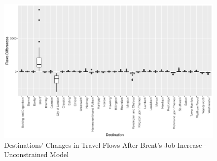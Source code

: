 \documentclass[a4paper,reqno,]{article}
\begin{document}
\begin{enumerate}
\begin{figure}[H]
\end{figure} 
\begin{figure}[H]
\centering
\begin{minipage}[b]{0.9\linewidth}
\centering
    \captionsetup{width=1\linewidth}
    \includegraphics[clip,trim=0cm 0.2cm 0cm 3.1cm,width=1\textwidth]{images/SIM/box_brent.pdf}
    \caption{Destinations' Changes in Travel Flows After Brent's Job Increase - Unconstrained Model}\label{fig: box_brent}
\end{minipage}
\end{figure}

\end{enumerate}
\end{document}
